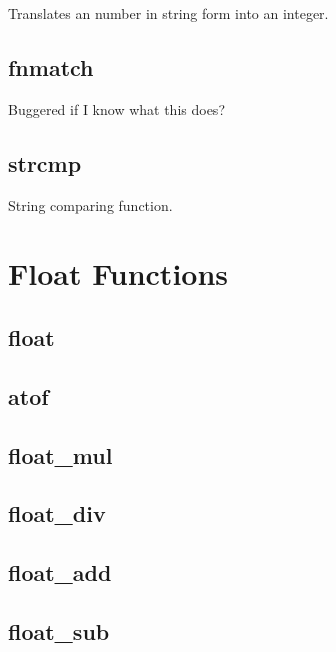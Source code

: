 Translates an number in string form into an integer.\hypertarget{Available_Native_Calls_Page_Fnmatch_Desc}{}\subsection{fnmatch}\label{Available_Native_Calls_Page_Fnmatch_Desc}
Buggered if I know what this does?\hypertarget{Available_Native_Calls_Page_Strcmp_Desc}{}\subsection{strcmp}\label{Available_Native_Calls_Page_Strcmp_Desc}
String comparing function.\hypertarget{Available_Native_Calls_Page_Float_ANC_Section}{}\section{Float Functions}\label{Available_Native_Calls_Page_Float_ANC_Section}
\hypertarget{Available_Native_Calls_Page_Float_Desc}{}\subsection{float}\label{Available_Native_Calls_Page_Float_Desc}
\hypertarget{Available_Native_Calls_Page_Atof_Desc}{}\subsection{atof}\label{Available_Native_Calls_Page_Atof_Desc}
\hypertarget{Available_Native_Calls_Page_Float_Mul_Desc}{}\subsection{float\_\-mul}\label{Available_Native_Calls_Page_Float_Mul_Desc}
\hypertarget{Available_Native_Calls_Page_Float_Div_Desc}{}\subsection{float\_\-div}\label{Available_Native_Calls_Page_Float_Div_Desc}
\hypertarget{Available_Native_Calls_Page_Float_Add_Desc}{}\subsection{float\_\-add}\label{Available_Native_Calls_Page_Float_Add_Desc}
\hypertarget{Available_Native_Calls_Page_Float_Sub_Desc}{}\subsection{float\_\-sub}\label{Available_Native_Calls_Page_Float_Sub_Desc}
